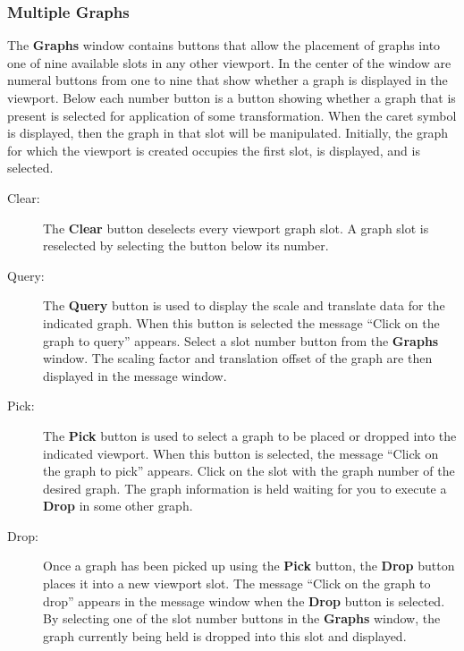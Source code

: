 \subsubsection{Multiple Graphs}

The {\bf Graphs} window contains buttons that allow the placement
of \twodim{} graphs into one of nine available slots in any other
\twodim{} viewport.
In the center of the window are numeral buttons from one to nine
that show whether a graph is displayed in the viewport.
Below each number button is a button showing whether a graph
that is present is selected for application of some
transformation.
When the caret symbol is displayed, then the graph in that slot
will be manipulated.
Initially, the graph for which the viewport is created occupies
the first slot, is displayed, and is selected.
%
%
\begin{description}
%
\item[Clear:]  The {\bf Clear} button deselects every viewport graph slot.
A graph slot is reselected by selecting the button below its number.
%
\item[Query:]  The {\bf Query} button is used to display the scale and
translate data for the indicated graph.  When this button is selected the
message ``Click on the graph to query'' appears.  Select a slot
number button from the {\bf Graphs} window. The scaling factor and translation
offset of the graph are then displayed in the message window.
%
\item[Pick:]  The {\bf Pick} button is used to select a graph
to be placed or dropped into the indicated viewport.  When this button is
selected, the message ``Click on the graph to pick'' appears.
Click on the slot with the graph number of the desired
graph.  The graph information is held waiting for
you to execute a {\bf Drop} in some other graph.
%
\item[Drop:]  Once a graph has been picked up using the {\bf Pick} button,
the {\bf Drop} button places it into a new viewport slot.
The message ``Click on the graph to drop'' appears in the message
window when the {\bf Drop} button is selected.
By selecting one of the slot number buttons in the {\bf Graphs}
window, the graph currently being held is dropped into this slot
and displayed.
\end{description}

